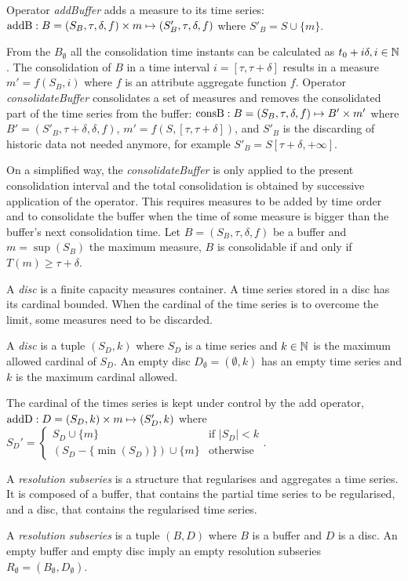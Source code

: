 Operator \emph{addBuffer} adds a measure to its time series:
$\operatorname{addB}: B = (S_B,\tau,\delta,f) \times m \mapsto
(S'_B,\tau,\delta,f)$ where $S'_B = S \cup \{m\} $.

From the $B_{\emptyset}$ all the consolidation time instants can be
calculated as $t_0+i\delta, i\in\mathbb{N}$. The consolidation of $B$ in a
time interval $i=[\tau,\tau+\delta]$ results in a measure
$m'=f(S_B,i)$ where $f$ is an attribute aggregate function
$f$. Operator \emph{consolidateBuffer} consolidates a set of measures
and removes the consolidated part of the time series from the buffer:
$\operatorname{consB} : B=(S_B,\tau,\delta,f) \mapsto B' \times m'$ where $ B'=
(S'_B,\tau+\delta,\delta,f)$, $m' = f(S,[\tau,\tau+\delta])$, and
$S'_B$ is the discarding of historic data not needed anymore, for example
$S'_B = S[\tau+\delta,+\infty]$.

On a simplified way, the \emph{consolidateBuffer} is only applied to the present
consolidation interval and the total consolidation is obtained by
successive application of the operator. This requires measures to be
added by time order and to consolidate the buffer when the time of
some measure is bigger than the buffer's next consolidation time.  Let
$B=(S_B,\tau,\delta,f)$ be a buffer and $m=\sup(S_B)$ the maximum
measure, $B$ is consolidable if and only if $T(m) \geq
\tau+\delta$.


A \emph{disc} is a finite capacity measures container. A time series
stored in a disc has its cardinal bounded. When the cardinal of the
time series is to overcome the limit, some measures need to be
discarded.
\begin{definition}%
  A \emph{disc} is a tuple $(S_D,k)$ where $S_D$ is a time series and
  $k\in\mathbb{N}$ is the maximum allowed cardinal of $S_D$.  An empty disc
  $D_{\emptyset} = (\emptyset,k)$ has an empty time series and $k$ is
  the maximum cardinal allowed.
\end{definition}

The cardinal of the times series is kept under control by the add
operator, $\operatorname{addD} : D=(S_D,k)\times m\mapsto (S'_D,k)$ where %
$
 S_D' = \begin{cases}
  S_D\cup\{m\}                 & \text{if } |S_D|<k  \\
  (S_D-\{\min(S_D)\}) \cup \{m\} & \text{otherwise}
\end{cases}  
$.


A \emph{resolution subseries} is a structure that regularises and
aggregates a time series. It is composed of a buffer, that contains
the partial time series to be regularised, and a disc, that contains
the regularised time series.
\begin{definition}%
  A \emph{resolution subseries} is a tuple $(B,D)$ where $B$ is a
  buffer and $D$ is a disc.  An empty buffer and empty disc imply an
  empty resolution subseries $R_{\emptyset} =
  (B_{\emptyset},D_{\emptyset})$.
\end{definition}
 
